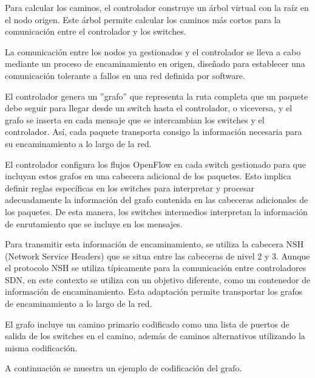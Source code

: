 \documentclass[a4paper, 12pt]{book}
\begin{document}
	Para calcular los caminos, el controlador construye un árbol virtual con la raíz en el nodo origen. Este árbol permite calcular los caminos más cortos para la comunicación entre el controlador y los switches.
		
	La comunicación entre los nodos ya gestionados y el controlador se lleva a cabo mediante un proceso de encaminamiento en origen, diseñado para establecer una comunicación tolerante a fallos en una red definida por software. 
	
	El controlador genera un ''grafo'' que representa la ruta completa que un paquete debe seguir para llegar desde un switch hasta el controlador, o viceversa, y el grafo se inserta en cada mensaje que se intercambian los switches y el controlador. Así, cada paquete transporta consigo la información necesaria para su encaminamiento a lo largo de la red.
	
	El controlador configura los flujos OpenFlow en cada switch gestionado para que incluyan estos grafos en una cabecera adicional de los paquetes. Esto implica definir reglas específicas en los switches para interpretar y procesar adecuadamente la información del grafo contenida en las cabeceras adicionales de los paquetes. De esta manera, los switches intermedios interpretan la información de enrutamiento que se incluye en los mensajes.
	
	Para transmitir esta información de encaminamiento, se utiliza la cabecera NSH (Network Service Headers) que se situa entre las cabeceras de nivel 2 y 3. Aunque el protocolo NSH se utiliza típicamente para la comunicación entre controladores SDN, en este contexto se utiliza con un objetivo diferente, como un contenedor de información de encaminamiento. Esta adaptación permite transportar los grafos de encaminamiento a lo largo de la red.
	
	El grafo incluye un camino primario codificado como una lista de puertos de salida de los switches en el camino, además de caminos alternativos utilizando la misma codificación.
	
	A continuación se muestra un ejemplo de codificación del grafo.
	
\end{document}

